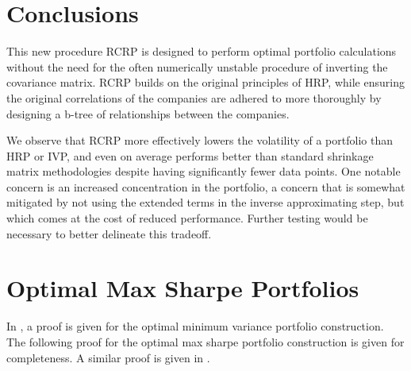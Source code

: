 \documentclass[10pt,twoside,titlepage]{article}   %
\begin{document}
\section{Conclusions}\label{sec-Conclusions}
This new procedure RCRP is designed to perform optimal portfolio calculations without the need for the often numerically unstable procedure of inverting the covariance matrix. 
RCRP builds on the original principles of HRP, while ensuring the original correlations of the companies are adhered to more thoroughly by designing a b-tree of relationships between the companies. 

We observe that RCRP more effectively lowers the volatility of a portfolio than HRP or IVP, 
and even on average performs better than standard shrinkage matrix methodologies despite having significantly fewer data points. 
One notable concern is an increased concentration in the portfolio, 
a concern that is somewhat mitigated by not using the extended terms in the inverse approximating step, 
but which comes at the cost of reduced performance. 
Further testing would be necessary to better delineate this tradeoff.

\appendix
\section{Optimal Max Sharpe Portfolios}\label{sec-Appendix1}
In \cite{HRP}, a proof is given for the optimal minimum variance portfolio construction. 
The following proof for the optimal max sharpe portfolio construction is given for completeness. 
A similar proof is given in \cite{StackExchange}.
\end{document}
